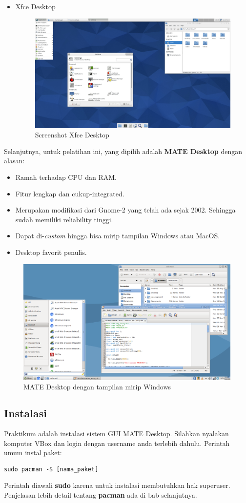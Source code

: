 \documentclass[12pt,]{article}
\begin{document}
\begin{itemize}
		\item Xfce Desktop
		\begin{figure}[H]
			\centering
			\includegraphics[width=0.8\linewidth]{images/vbox_de/xfce}
			\caption{Screenshot Xfce Desktop}
		\end{figure}
	\end{itemize}

	Selanjutnya, untuk pelatihan ini, yang dipilih adalah \textbf{MATE Desktop} dengan alasan:
	\begin{itemize}
		\item Ramah terhadap CPU dan RAM.
		\item Fitur lengkap dan cukup-integrated.
		\item Merupakan modifikasi dari Gnome-2 yang telah ada sejak 2002.
		Sehingga sudah memiliki reliability tinggi.
		\item Dapat di-\textit{custom} hingga bisa mirip tampilan Windows atau MacOS.
		\item Desktop favorit penulis.
	\end{itemize}
	\begin{figure}[H]
		\centering
		\includegraphics[width=0.8\linewidth]{images/vbox_de/mymate}
		\caption{MATE Desktop dengan tampilan mirip Windows}
	\end{figure}

	\subsection{Instalasi}
	Praktikum adalah instalasi sistem GUI MATE Desktop.
	Silahkan nyalakan komputer VBox dan login dengan username anda terlebih dahulu.
	Perintah umum instal paket:
	\begin{verbatim}
sudo pacman -S [nama_paket]
	\end{verbatim}
	Perintah diawali \textbf{sudo} karena untuk instalasi membutuhkan hak superuser.
	Penjelasan lebih detail tentang \textbf{pacman} ada di bab selanjutnya.
\end{document}
